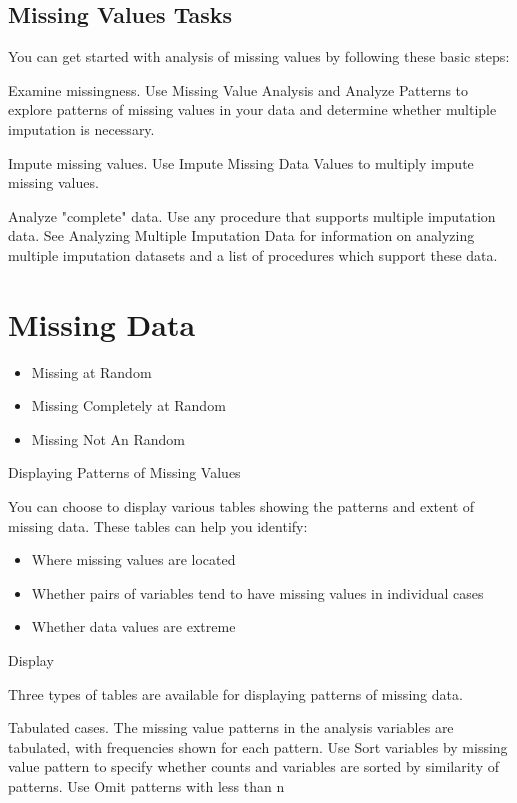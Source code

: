 \documentclass[12pt]{article}
\begin{document}
\subsection{Missing Values Tasks}

You can get started with analysis of missing values by following these basic steps:

 Examine missingness. Use Missing Value Analysis and Analyze Patterns to explore patterns of missing values in your data and determine whether multiple imputation is necessary.

 Impute missing values. Use Impute Missing Data Values to multiply impute missing values.

 Analyze "complete" data. Use any procedure that supports multiple imputation data. See Analyzing Multiple Imputation Data for information on analyzing multiple imputation datasets and a list of procedures which support these data.
\section{Missing Data}

\begin{itemize}
\item Missing at Random
\item Missing Completely at Random
\item Missing Not An Random
\end{itemize}
Displaying Patterns of Missing Values

You can choose to display various tables showing the patterns and extent of missing data. These tables can help you identify:

\begin{itemize}
\item Where missing values are located

\item Whether pairs of variables tend to have missing values in individual cases

\item Whether data values are extreme
\end{itemize}

Display

Three types of tables are available for displaying patterns of missing data.

Tabulated cases. The missing value patterns in the analysis variables are tabulated, with frequencies shown for each pattern. Use Sort variables by missing value pattern to specify whether counts and variables are sorted by similarity of patterns. Use Omit patterns with less than n %
\end{document}
